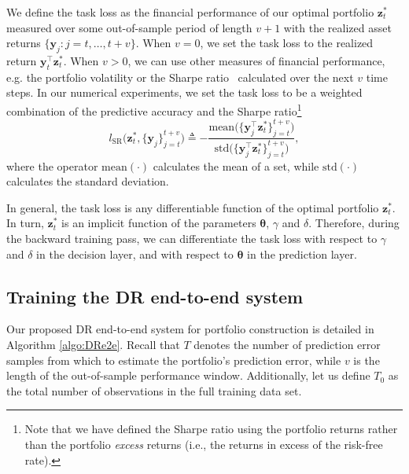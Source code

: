 \documentclass[10pt, twocolumn]{article}
\theoremstyle{plain}
\theoremstyle{definition}
\begin{document}
We define the task loss as the financial performance of our optimal
portfolio \(\bm{z}_{t}^*\) measured over some out-of-sample period of 
length \(v+1\) with the realized asset returns
\(\{\bm{y}_j : j= t, \ldots,t+v\}\). When \(v = 0\), we set the task 
loss to the realized return \(\bm{y}_t^\top \bm{z}_t^*\). When 
\(v > 0\), we can use other measures of financial performance, e.g. the
portfolio volatility or the Sharpe ratio~\citep{sharpe1994sharpe} 
calculated over the next \(v\) time steps. In our numerical experiments, 
we set the task loss to be a weighted combination of the predictive accuracy
and the Sharpe ratio\footnote{Note that we have defined
the Sharpe ratio using the portfolio returns rather than the portfolio
\emph{excess} returns (i.e., the returns in excess of the risk-free
rate).}
\begin{equation}
\label{eq:loss_perf_sharpe}
	l_{\text{SR}}\big(\bm{z}_{t}^*, \{\bm{y}_j\}_{j=t}^{t+v}\big) \triangleq -\frac{\text{mean}\big(\{\bm{y}_{j}^\top \bm{z}_{t}^*\}_{j=t}^{t+v}\big)}{\text{std}\big(\{\bm{y}_{j}^\top \bm{z}_{t}^*\}_{j=t}^{t+v}\big)},
\end{equation}
where the operator \(\text{mean}(\cdot)\) calculates the mean of a set,
while \(\text{std}(\cdot)\) calculates the standard deviation.   
 
In general, the task loss is any differentiable function of the optimal
portfolio \(\bm{z}_{t}^*\). In turn, \(\bm{z}_{t}^*\) is an implicit
function of the parameters \(\bm{\theta}\), \(\gamma\) and
\(\delta\). Therefore, during the backward training pass, we can
differentiate the task loss with respect to \(\gamma\) and \(\delta\) in
the decision layer, and with respect to \(\bm{\theta}\) in the prediction
layer.   

\subsection{Training the DR end-to-end system}\label{sec:algo}

Our proposed DR end-to-end system for portfolio construction is detailed
in Algorithm \ref{algo:DRe2e}. Recall that \(T\) denotes the number of
prediction error samples from which to estimate the portfolio's prediction
error, while \(v\) is the length of the out-of-sample performance
window. Additionally, let us define \(T_0\) as the total number of
observations in the full training data set.
\end{document}
